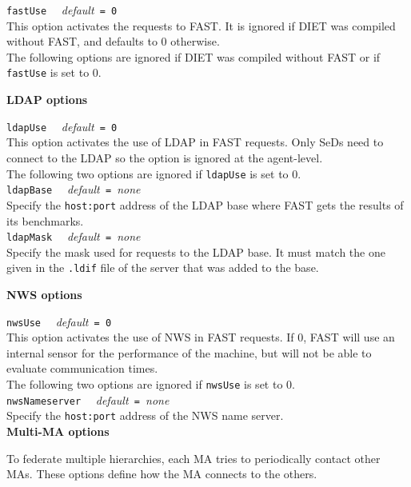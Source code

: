 \noindent
\texttt{fastUse} \ \ \emph{default}\texttt{ = 0}\\ This option
activates the requests to FAST. It is ignored if DIET was compiled
without FAST, and defaults to 0 otherwise. \\

The following options are ignored if DIET was compiled without FAST or if
\texttt{fastUse} is set to 0.

\noindent
\textbf{LDAP options}

\noindent
\texttt{ldapUse} \ \ \emph{default}\texttt{ = 0} \\
This option activates the use of LDAP in FAST requests.  Only SeDs
need to connect to the LDAP so the option is ignored at the agent-level. \\

The following two options are ignored if \texttt{ldapUse} is set to 0.
\\

\noindent
\texttt{ldapBase} \ \ \emph{default}\texttt{ = }\emph{none}\\ Specify
the \texttt{host:port} address of the LDAP base where FAST gets the
results of its benchmarks.  \\

\noindent
\texttt{ldapMask} \ \ \emph{default}\texttt{ = }\emph{none}\\ Specify
the mask used for requests to the LDAP base. It must match the one
given in the \texttt{.ldif} file of the server that was added to the
base.


\noindent
\textbf{NWS options}

\noindent
\texttt{nwsUse} \ \ \emph{default}\texttt{ = 0}\\ This option
activates the use of NWS in FAST requests. If 0, FAST will use an
internal sensor for the performance of the machine, but will not be
able to evaluate communication times.  \\

The following two options are ignored if \texttt{nwsUse} is set to 0.
\\

\noindent
\texttt{nwsNameserver} \ \ \emph{default}\texttt{ = }\emph{none}\\
Specify the \texttt{host:port} address of the NWS name server.
\\

\noindent
\textbf{Multi-MA options}

To federate multiple hierarchies, each MA tries to periodically contact other
MAs. These options define how the MA connects to the others.\\

